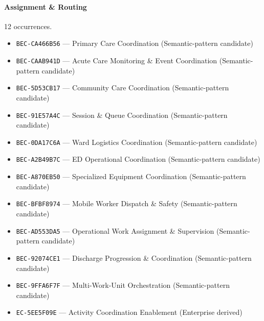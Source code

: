 \documentclass[11pt,a4paper,openany]{book}
\begin{document}
\paragraph{Assignment \& Routing} 12 occurrences.\par
\begin{itemize}
\item \texttt{BEC-CA466B56} --- Primary Care Coordination (Semantic-pattern candidate)
\item \texttt{BEC-CAAB941D} --- Acute Care Monitoring \& Event Coordination (Semantic-pattern candidate)
\item \texttt{BEC-5D53CB17} --- Community Care Coordination (Semantic-pattern candidate)
\item \texttt{BEC-91E57A4C} --- Session \& Queue Coordination (Semantic-pattern candidate)
\item \texttt{BEC-0DA17C6A} --- Ward Logistics Coordination (Semantic-pattern candidate)
\item \texttt{BEC-A2B49B7C} --- ED Operational Coordination (Semantic-pattern candidate)
\item \texttt{BEC-A870EB50} --- Specialized Equipment Coordination (Semantic-pattern candidate)
\item \texttt{BEC-BFBF8974} --- Mobile Worker Dispatch \& Safety (Semantic-pattern candidate)
\item \texttt{BEC-AD553DA5} --- Operational Work Assignment \& Supervision (Semantic-pattern candidate)
\item \texttt{BEC-92074CE1} --- Discharge Progression \& Coordination (Semantic-pattern candidate)
\item \texttt{BEC-9FFA6F7F} --- Multi-Work-Unit Orchestration (Semantic-pattern candidate)
\item \texttt{EC-5EE5F09E} --- Activity Coordination Enablement (Enterprise derived)
\end{itemize}
\end{document}
